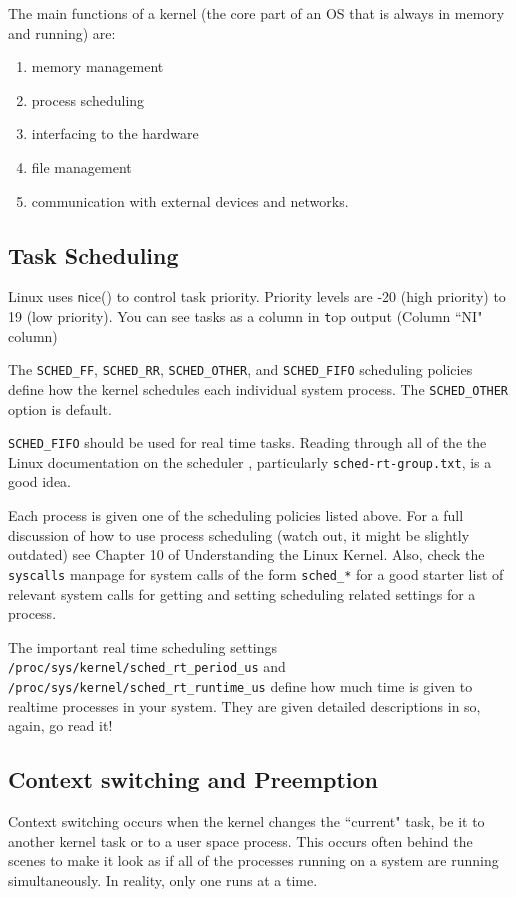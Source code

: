 \documentclass{article}
\begin{document}
The main functions of a kernel (the core part of an OS that is always in memory and running) are\cite{IntroLinuxForRealTime}:
\begin{enumerate}
\item memory management
\item process scheduling
\item interfacing to the hardware
\item file management
\item communication with external devices and networks.
\end{enumerate}

\subsection{Task Scheduling}
Linux uses {\texttt nice()} to control task priority.  Priority levels are -20 (high priority) to 19 (low priority).  You can see tasks as a column in {\texttt top} output (Column ``NI" column)

The {\texttt{SCHED\_FF}, \texttt{SCHED\_RR}, \texttt{SCHED\_OTHER}, and \texttt{SCHED\_FIFO}} scheduling policies define how the kernel schedules each individual system process.  The \texttt{SCHED\_OTHER} option is default.

\texttt{SCHED\_FIFO} should be used for real time tasks. Reading through all of the the Linux documentation on the scheduler \cite{schedulerDocs}, particularly \texttt{sched-rt-group.txt}, is a good idea.

Each process is given one of the scheduling policies listed above.  For a full discussion of how to use process scheduling (watch out, it might be slightly outdated) see Chapter 10 of Understanding the Linux Kernel.\cite{linuxKernelCh10}  Also, check the \texttt{syscalls} manpage for system calls of the form \texttt{sched\_*} for a good starter list of relevant system calls for getting and setting scheduling related settings for a process.

The important real time scheduling settings \texttt{/proc/sys/kernel/sched\_rt\_period\_us} and \texttt{/proc/sys/kernel/sched\_rt\_runtime\_us} define how much time is given to realtime processes in your system.  They are given detailed descriptions in \cite{schedulerDocs} so, again, go read it!

\subsection{Context switching and Preemption}
Context switching occurs when the kernel changes the ``current" task, be it to another kernel task or to a user space process.  This occurs often behind the scenes to make it look as if all of the processes running on a system are running simultaneously.  In reality, only one runs at a time.
\end{document}
